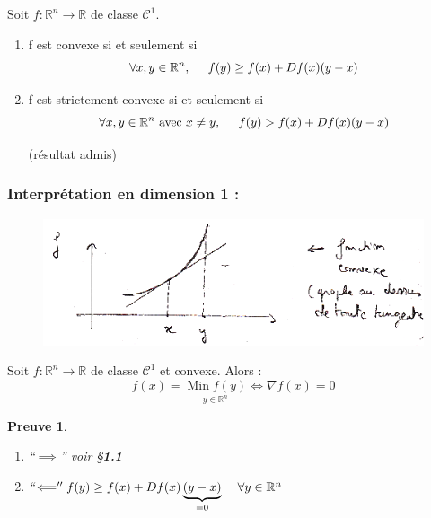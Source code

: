\documentclass[a4paper,11pt]{article}
\newcommand{\R}{\mathbb{R}}
\newcommand{\deffonc}[3]{#1 : #2 \longrightarrow #3}
\DeclareMathOperator{\Min}{Min}
\theoremstyle{plain} %
\newtheorem{preuve}{Preuve}
\begin{document}
\begin{lemme}
    Soit $\deffonc{f}{\R^n}{\R}$ de classe $\mathcal{C}^1$.
    \begin{enumerate}[label=•]
        \item f est convexe si et seulement si 
            \[
                \forall x,y \in \R^n, \hspace{0.5cm} f(y) \geq f(x) + Df(x)(y-x)
            \]
        \item f est strictement convexe si et seulement si
            \[
                \forall x,y \in \R^n \text{ avec } x \ne y, \hspace{0.5cm} f(y) > f(x) + Df(x)(y-x)
            \]

            (résultat admis)
    \end{enumerate}
\end{lemme}

\vspace{0.1cm}
\subsubsection*{Interprétation en dimension 1 :}
\vspace{0.7cm}

\begin{figure}[h]
    \centering
    \includegraphics[scale=0.7]{7optim-cvx-tang.png}
    \label{fig:7optim-cvx-tang}
\end{figure}

\begin{ftheo}
    Soit $\deffonc{f}{\R^n}{\R}$ de classe $\mathcal{C}^1$ et convexe. Alors :
    \[
        f(x) = \underset{y \in \R^n}{\Min f(y)} \iff \nabla f(x) = 0
    \]
\end{ftheo}

\begin{preuve}
    \begin{enumerate}[label=•]
        \item ``$\implies$'' voir \S \textbf{1.1}
        \item ``$\Longleftarrow'' f(y) \geq f(x) + Df(x)\underbrace{(y-x)}_{= 0} \hspace{0.4cm} \forall y \in \R^n$
    \end{enumerate}
\end{preuve}
\end{document}

